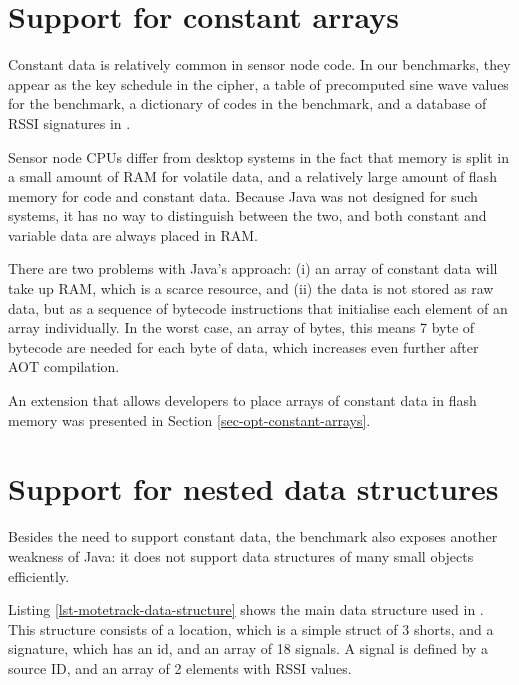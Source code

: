 

\section{Support for constant arrays}
\label{sec-const-data}
Constant data is relatively common in sensor node code. In our benchmarks, they appear as the key schedule in the  cipher, a table of precomputed sine wave values for the  benchmark, a dictionary of codes in the  benchmark, and a database of RSSI signatures in .

Sensor node CPUs differ from desktop systems in the fact that memory is split in a small amount of RAM for volatile data, and a relatively large amount of flash memory for code and constant data. Because Java was not designed for such systems, it has no way to distinguish between the two, and both constant and variable data are always placed in RAM.

There are two problems with Java's approach: (i) an array of constant data will take up RAM, which is a scarce resource, and (ii) the data is not stored as raw data, but as a sequence of bytecode instructions that initialise each element of an array individually. In the worst case, an array of bytes, this means 7 byte of bytecode are needed for each byte of data, which increases even further after AOT compilation.

An extension that allows developers to place arrays of constant data in flash memory was presented in Section \ref{sec-opt-constant-arrays}.




\section{Support for nested data structures}
\label{sec-nested-data}
Besides the need to support constant data, the  benchmark also exposes another weakness of Java: it does not support data structures of many small objects efficiently.

Listing \ref{lst-motetrack-data-structure} shows the main  data structure used in . This structure consists of a location, which is a simple struct of 3 shorts, and a signature, which has an id, and an array of 18 signals. A signal is defined by a source ID, and an array of 2 elements with RSSI values.

